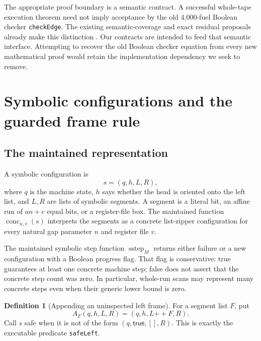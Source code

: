 \documentclass[11pt]{article}
\theoremstyle{definition}\newtheorem{definition}[theorem]{Definition}
\theoremstyle{remark}\newtheorem{remark}[theorem]{Remark}
\newcommand{\cat}{\mathbin{+\!+}}
\newcommand{\Conc}{\operatorname{conc}}
\newcommand{\Step}{\operatorname{sstep}}
\newcommand{\code}[1]{\nolinkurl{#1}}
\begin{document}
The appropriate proof boundary is a semantic contract. A successful whole-tape execution theorem need not imply acceptance by the old 4,000-fuel Boolean checker \code{checkEdge}. The existing semantic-coverage and exact residual proposals already make this distinction \cite{semantic,residual}. Our contracts are intended to feed that semantic interface. Attempting to recover the old Boolean checker equation from every new mathematical proof would retain the implementation dependency we seek to remove.

\section{Symbolic configurations and the guarded frame rule}

\subsection{The maintained representation}

A symbolic configuration is
\[
 s=(q,h,L,R),
\]
where $q$ is the machine state, $h$ says whether the head is oriented onto the left list, and $L,R$ are lists of symbolic segments. A segment is a literal bit, an affine run of $an+c$ equal bits, or a register-file box. The maintained function $\Conc_{n,v}(s)$ interprets the segments as a concrete list-zipper configuration for every natural gap parameter $n$ and register file $v$.

The maintained symbolic step function $\Step_M$ returns either failure or a new configuration with a Boolean progress flag. That flag is conservative: true guarantees at least one concrete machine step; false does not assert that the concrete step count was zero. In particular, whole-run scans may represent many concrete steps even when their generic lower bound is zero.

\begin{definition}[Appending an uninspected left frame]
For a segment list $F$, put
\[
 A_F(q,h,L,R)=(q,h,L\cat F,R).
\]
Call $s$ safe when it is not of the form $(q,\mathsf{true},[],R)$. This is exactly the executable predicate \code{safeLeft}.
\end{definition}
\end{document}

